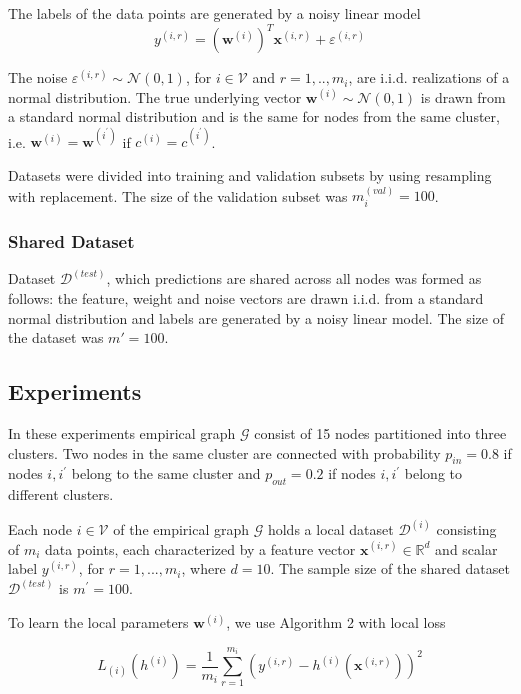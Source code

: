 \documentclass{article}
\begin{document}
The labels of the data points are generated by a noisy linear model
\begin{equation}
{y}^{(i,r)} = (\mathbf{w}^{(i)})^T\mathbf{x}^{(i,r)} + {\varepsilon}^{(i,r)}
\end{equation}

The noise ${\varepsilon}^{(i,r)} \sim \mathcal{N}(0, 1)$, for $i \in \mathcal{V}$ and $r=1,..,{m}_{i}$, are i.i.d. realizations of a normal distribution. The true underlying vector $\mathbf{w}^{(i)} \sim \mathcal{N}(0,1)$ is drawn from a standard normal distribution and is the same for nodes from the same cluster, i.e. $\mathbf{w}^{(i)}=\mathbf{w}^{({i}^{'})}$ if ${c}^{(i)}={c}^{({i}^{'})}$.

Datasets were divided into training and validation subsets by using resampling with replacement. The size of the validation subset was ${m}^{(val)}_{i}=100$. 

\subsubsection{Shared Dataset}

Dataset $\mathcal{D}^{(test)}$, which predictions are shared across all nodes was formed as follows:
the feature, weight and noise vectors are drawn i.i.d. from a standard normal distribution and labels are generated by a noisy linear model. The size of the dataset was $m'=100$. 

\subsection{Experiments}
In these experiments empirical graph $\mathcal{G}$ consist of 15 nodes partitioned into three clusters. Two nodes in the same cluster are connected with probability ${p}_{in}=0.8$ if nodes $i,{i}^{'}$ belong to the same cluster and ${p}_{out}=0.2$ if nodes $i,{i}^{'}$ belong to different clusters. 

Each node $i \in \mathcal {V}$ of the empirical graph $\mathcal {G}$ holds a local dataset $\mathcal{D}^{(i)}$ consisting of ${m}_{i}$ data points, each characterized by a feature vector $\mathbf{x}^{(i,r)} \in \mathbb{R}^{d}$ and scalar label ${y}^{(i,r)}$, for $r=1,...,{m}_{i}$, where $d=10$.
The sample size of the shared dataset $\mathcal{D}^{(test)}$ is ${m}^{'}=100$.

To learn the local parameters $\mathbf{w}^{(i)}$, we use Algorithm 2 with local loss 

\begin{equation}
{L}_{(i)}({h}^{(i)}) = \frac{1}{{m}_{i}} \sum_{r=1}^{{m}_{i}}\left({y}^{(i,r)} - {h}^{(i)}(\mathbf{x}^{(i,r)}) \right)^2
\end{equation}
\end{document}
